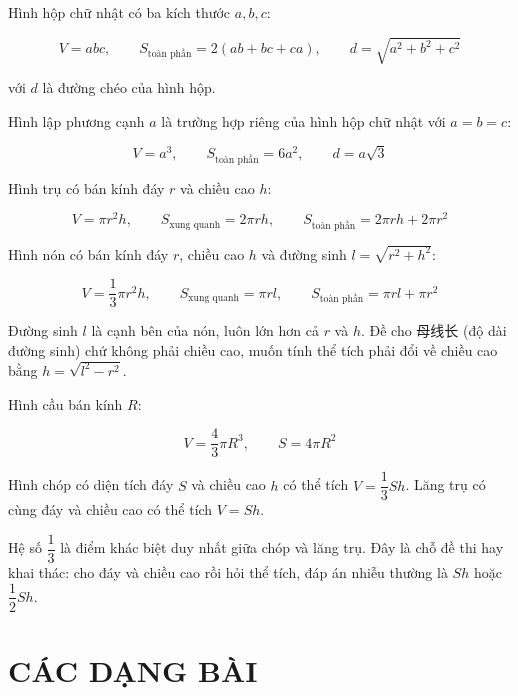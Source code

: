 \documentclass[11pt, a4paper]{article}
\begin{document}
\begin{dinhly}
Hình hộp chữ nhật có ba kích thước $a, b, c$:

$$V = abc, \qquad S_{\text{toàn phần}} = 2(ab + bc + ca), \qquad d = \sqrt{a^2+b^2+c^2}$$

với $d$ là đường chéo của hình hộp.
\end{dinhly}
\begin{dinhly}
Hình lập phương cạnh $a$ là trường hợp riêng của hình hộp chữ nhật với $a = b = c$:

$$V = a^3, \qquad S_{\text{toàn phần}} = 6a^2, \qquad d = a\sqrt{3}$$
\end{dinhly}
\begin{dinhly}
Hình trụ có bán kính đáy $r$ và chiều cao $h$:

$$V = \pi r^2 h, \qquad S_{\text{xung quanh}} = 2\pi r h, \qquad S_{\text{toàn phần}} = 2\pi r h + 2\pi r^2$$
\end{dinhly}
\begin{dinhly}
Hình nón có bán kính đáy $r$, chiều cao $h$ và đường sinh $l = \sqrt{r^2+h^2}$:

$$V = \frac{1}{3}\pi r^2 h, \qquad S_{\text{xung quanh}} = \pi r l, \qquad S_{\text{toàn phần}} = \pi r l + \pi r^2$$

 Đường sinh $l$ là cạnh bên của nón, luôn lớn hơn cả $r$ và $h$. Đề cho 母线长 (độ dài đường sinh) chứ không phải chiều cao, muốn tính thể tích phải đổi về chiều cao bằng $h = \sqrt{l^2-r^2}$.
\end{dinhly}
\begin{dinhly}
Hình cầu bán kính $R$:

$$V = \frac{4}{3}\pi R^3, \qquad S = 4\pi R^2$$
\end{dinhly}
\begin{dinhly}
Hình chóp có diện tích đáy $S$ và chiều cao $h$ có thể tích $V = \dfrac{1}{3}Sh$. Lăng trụ có cùng đáy và chiều cao có thể tích $V = Sh$.

 Hệ số $\dfrac{1}{3}$ là điểm khác biệt duy nhất giữa chóp và lăng trụ. Đây là chỗ đề thi hay khai thác: cho đáy và chiều cao rồi hỏi thể tích, đáp án nhiễu thường là $Sh$ hoặc $\dfrac{1}{2}Sh$.

\end{dinhly}
\section{CÁC DẠNG BÀI}
\end{document}

